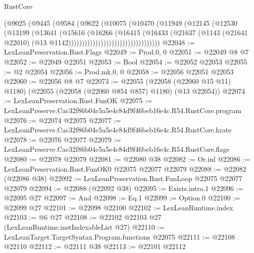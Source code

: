 \begin{lexlean}{RustCore}
\begin{coremodule}
                                    (@9025
                                      (@9445
                                        (@9584
                                          (@9622
                                            (@10075
                                              (@10470
                                                (@11949
                                                  (@12145
                                                    (@12530
                                                      (@13199
                                                        (@13641
                                                          (@15616
                                                            (@16266
                                                              (@16415
                                                                (@16433
                                                                  (@21637
                                                                    (@1143
                                                                      (@21641 @22010)
                                                                      (@13
                                                                        @1142))))))))))))))))))))))))))))))))))
@22048 := LexLeanPreservation.Rust.Flags
@22049 := Prod.{0, 0}
@22051 := @22049 @8 @7
@22052 := @22049 @22051
@22053 := Bool
@22054 := @22052 @22053
@22055 := @2 @22054
@22056 := Prod.mk.{0, 0}
@22058 := @22056 @22051 @22053
@22060 := @22056 @8 @7
@22073 := @22055
    (@22058 (@22060 @15 @11) @1180)
    (@22055 (@22058 (@22060 @854 @857) @1180) (@13 @22054))
@22074 := LexLeanPreservation.Rust.FunOK
@22075 := LexLeanPreserve.Cac32f86b04c5a5e4c84d9f46beb16e4c.R54.RustCore.program
@22076 := @22074 @22075
@22077 := LexLeanPreserve.Cac32f86b04c5a5e4c84d9f46beb16e4c.R54.RustCore.krate
@22078 := @22076 @22077
@22079 := LexLeanPreserve.Cac32f86b04c5a5e4c84d9f46beb16e4c.R54.RustCore.flags
@22080 := @22078 @22079
@22081 := @22080 @38
@22082 := Or.inl
@22086 := LexLeanPreservation.Rust.FunOK0 @22075 @22077 @22079
@22088 := @22082 (@22086 @38)
@22092 := LexLeanPreservation.Rust.FunLoop @22075 @22077 @22079
@22094 := @22088 (@22092 @38)
@22095 := Exists.intro.{1}
@22096 := @22095 @27
@22097 := And
@22098 := Eq.{1}
@22099 := Option.{0}
@22100 := @22099 @27
@22101 := @22098 @22100
@22102 := LexLeanRuntime.index
@22103 := @6 @27
@22108 := @22102 @22103 @27 (LexLeanRuntime.instIndexableList @27)
@22110 := LexLeanTarget.TargetSyntax.Program.functions @22075
@22111 := @22108 @22110
@22112 := @22111 @38
@22113 := @22101 @22112

\end{coremodule}
\end{lexlean}
